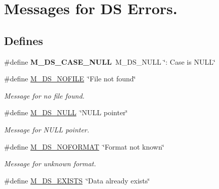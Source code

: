 \hypertarget{group___m___d_s___messages}{
\section{Messages for DS Errors.}
\label{group___m___d_s___messages}
}
\subsection*{Defines}
\begin{DoxyCompactItemize}
\item 
\hypertarget{group___m___d_s___messages_ga705c3e02cba93cfcf85ba8ad7777b054}{
\#define {\bfseries M\_\-DS\_\-CASE\_\-NULL}~M\_\-DS\_\-NULL \char`\"{}: Case is NULL\char`\"{}}
\label{group___m___d_s___messages_ga705c3e02cba93cfcf85ba8ad7777b054}

\item 
\hypertarget{group___m___d_s___messages_gadd043ccc956aaee49b9c646f940c167b}{
\#define \hyperlink{group___m___d_s___messages_gadd043ccc956aaee49b9c646f940c167b}{M\_\-DS\_\-NOFILE}~\char`\"{}File not found\char`\"{}}
\label{group___m___d_s___messages_gadd043ccc956aaee49b9c646f940c167b}

\begin{DoxyCompactList}\small\item\em Message for no file found. \item\end{DoxyCompactList}\item 
\hypertarget{group___m___d_s___messages_ga0d502db70be066b76fa94dc1eb9ef75c}{
\#define \hyperlink{group___m___d_s___messages_ga0d502db70be066b76fa94dc1eb9ef75c}{M\_\-DS\_\-NULL}~\char`\"{}NULL pointer\char`\"{}}
\label{group___m___d_s___messages_ga0d502db70be066b76fa94dc1eb9ef75c}

\begin{DoxyCompactList}\small\item\em Message for NULL pointer. \item\end{DoxyCompactList}\item 
\hypertarget{group___m___d_s___messages_ga05191be522c29caa6f80baddfb2a109c}{
\#define \hyperlink{group___m___d_s___messages_ga05191be522c29caa6f80baddfb2a109c}{M\_\-DS\_\-NOFORMAT}~\char`\"{}Format not known\char`\"{}}
\label{group___m___d_s___messages_ga05191be522c29caa6f80baddfb2a109c}

\begin{DoxyCompactList}\small\item\em Message for unknown format. \item\end{DoxyCompactList}\item 
\hypertarget{group___m___d_s___messages_ga33ff33533363ff94af03b832587f47c6}{
\#define \hyperlink{group___m___d_s___messages_ga33ff33533363ff94af03b832587f47c6}{M\_\-DS\_\-EXISTS}~\char`\"{}Data already exists\char`\"{}}
\label{group___m___d_s___messages_ga33ff33533363ff94af03b832587f47c6}


\end{DoxyCompactItemize}
